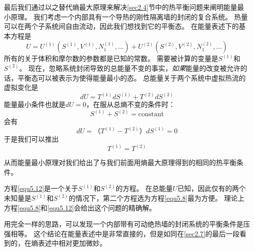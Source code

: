 最后我们通过以之替代熵最大原理来解决\ref{sec2.4}节中的热平衡问题来阐明能量最小原理。
我们考虑一个内部具有一个导热的刚性隔离墙的封闭的复合系统。
热量可以在两个子系统间自由流动，因此我们想找到它的平衡态。
在能量表述下的基本方程是
\begin{equation}
\label{equ5.8}
U=U^{(1)}(S^{(1)},V^{(1)},N^{(1)}_1,\ldots)+U^{(2)}(S^{(2)},V^{(2)},N^{(2)}_1,\ldots)
\end{equation}
所有的关于体积和摩尔数的参数都是已知的常数。
需要被计算的变量是$S^{(1)}$和$S^{(2)}$。
现在，忽略系统封闭导致的总能量不变的事实，{\it 如果}能量的改变被允许的话，平衡态可以被表示为使得能量最小的态。
总能量关于两个系统中虚拟热流的虚拟变化是
\begin{equation}
\label{equ5.9}
dU=T^{(1)}dS^{(1)}+T^{(2)}dS^{(2)}
\end{equation}
能量最小条件也就是$dU=0$，在服从总熵不变的条件时：
\begin{equation}
\label{equ5.10}
S^{(1)}+S^{(2)}=\text{constant}
\end{equation}
会有
\begin{equation}
\label{equ5.11}
dU=（T^{(1)}-T^{(2)}）dS^{(1)}=0
\end{equation}
于是我们可以推出
\begin{equation}
\label{equ5.12}
T^{(1)}=T^{(2)}
\end{equation}

从而能量最小原理对我们给出了与我们前面用熵最大原理得到的相同的热平衡条件。

方程\eqref{equ5.12}是一个关于$S^{(1)}$和$S^{(2)}$的方程。
在总能量$U$已知，因此仅有的两个未知量是$S^{(1)}$和$S^{(2)}$的情况下，第二个方程选为方程\eqref{equ5.8}最为方便。
理论上方程\eqref{equ5.8}和\eqref{equ5.12}会给出这个问题的精确解。

用完全一样的思路，可以发现一个内部带有可动绝热墙的封闭系统的平衡条件是压强相等。
这个结论在能量表述中是非常直接的，但是如同在\ref{sec2.7}的最后一段看到的，在熵表述中相对更加微妙。



